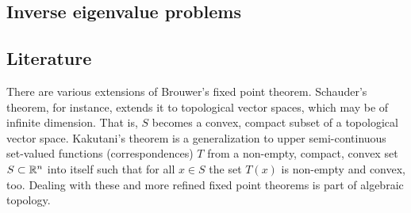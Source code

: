 \documentclass[11pt,a4paper]{article}
\theoremstyle{plain}
\theoremstyle{definition}
\theoremstyle{remark}
\begin{document}
\subsection{Inverse eigenvalue problems}


\subsection{Literature}

There are various extensions of Brouwer's fixed point theorem. Schauder's theorem,
for instance, extends it to topological vector spaces, which may be of infinite
dimension. That is, $S$ becomes a convex, compact subset of a topological vector
space. Kakutani's theorem is a generalization to upper semi-continuous set-valued
functions (correspondences) $T$ from a non-empty, compact, convex set $S\subset\mathbb{R}^n$
into itself such that for all $x\in S$ the set $T(x)$ is non-empty and convex, too.
Dealing with these and more refined fixed point theorems is part of algebraic topology.
\end{document}
